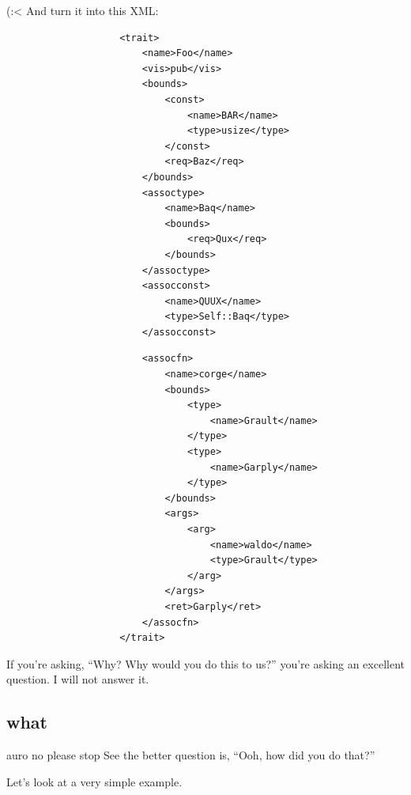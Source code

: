 \documentclass{beamer}
\begin{document}
	\begin{frame}[fragile]{(:<}
		And turn it into this XML:
		\begin{center}
			\begin{minipage}{0.45\linewidth}
				\begin{verbatim}
					<trait>
						<name>Foo</name>
						<vis>pub</vis>
						<bounds>
							<const>
								<name>BAR</name>
								<type>usize</type>
							</const>
							<req>Baz</req>
						</bounds>
						<assoctype>
							<name>Baq</name>
							<bounds>
								<req>Qux</req>
							</bounds>
						</assoctype>
						<assocconst>
							<name>QUUX</name>
							<type>Self::Baq</type>
						</assocconst>
				\end{verbatim}
			\end{minipage}
			\hfill
			\begin{minipage}{0.45\linewidth}
				\begin{verbatim}
						<assocfn>
							<name>corge</name>
							<bounds>
								<type>
									<name>Grault</name>
								</type>
								<type>
									<name>Garply</name>
								</type>
							</bounds>
							<args>
								<arg>
									<name>waldo</name>
									<type>Grault</type>
								</arg>
							</args>
							<ret>Garply</ret>
						</assocfn>
					</trait>
				\end{verbatim}
			\end{minipage}
		\end{center}

		\pause

		If you're asking, ``Why? Why would you do this to us?'' you're asking an excellent question.
		\pause I will not answer it.
	\end{frame}

	\subsection{what}
	\begin{frame}{auro no please stop}
		See the better question is, ``Ooh, how did you do that?'' \\

		\pause

		Let's look at a very simple example.
	\end{frame}
\end{document}
